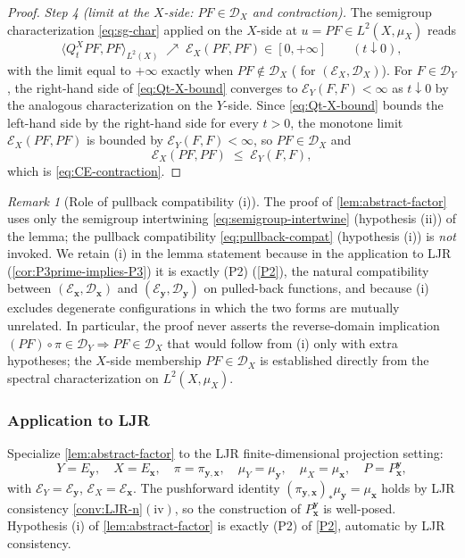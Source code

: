 \documentclass[11pt,reqno]{amsart}
\theoremstyle{plain}
\theoremstyle{definition}
\theoremstyle{remark}
\newtheorem{remark}[theorem]{Remark}
\newcommand{\cD}{\mathcal D}
\newcommand{\cE}{\mathcal E}
\begin{document}
\begin{proof}
\emph{Step 4 (limit at the $X$-side: $PF\in\cD_{X}$ and
contraction).}
The semigroup characterization \cref{eq:sg-char} applied on the
$X$-side at $u=PF\in L^{2}(X,\mu_{X})$ reads
\[
  \langle Q_{t}^{X}PF,PF\rangle_{L^{2}(X)}
  \;\nearrow\;\cE_{X}(PF,PF)\in[0,+\infty]\qquad(t\downarrow 0),
\]
with the limit equal to $+\infty$ exactly when $PF\notin\cD_{X}$
(\cite[Lem.~1.3.4]{FOT} for $(\cE_{X},\cD_{X})$). For
$F\in\cD_{Y}$, the right-hand side of \cref{eq:Qt-X-bound}
converges to $\cE_{Y}(F,F)<\infty$ as $t\downarrow 0$ by the
analogous characterization on the $Y$-side. Since
\cref{eq:Qt-X-bound} bounds the left-hand side by the right-hand
side for every $t>0$, the monotone limit $\cE_{X}(PF,PF)$ is
bounded by $\cE_{Y}(F,F)<\infty$, so $PF\in\cD_{X}$ and
\[
  \cE_{X}(PF,PF)\;\le\;\cE_{Y}(F,F),
\]
which is \cref{eq:CE-contraction}.
\end{proof}

\begin{remark}[Role of pullback compatibility (i)]\label{rem:pullback-not-used-in-proof}
The proof of \cref{lem:abstract-factor} uses only the semigroup
intertwining \cref{eq:semigroup-intertwine} (hypothesis (ii)) of
the lemma; the pullback compatibility
\cref{eq:pullback-compat} (hypothesis (i)) is \emph{not} invoked.
We retain (i) in the lemma statement because in the application to
LJR (\cref{cor:P3prime-implies-P3}) it is exactly (P2)
(\cref{P2}), the natural compatibility between
$(\cE_{\mathbf x},\cD_{\mathbf x})$ and
$(\cE_{\mathbf y},\cD_{\mathbf y})$ on pulled-back functions, and
because (i) excludes degenerate configurations in which the two
forms are mutually unrelated. In particular, the proof never asserts
the reverse-domain implication $(PF)\circ\pi\in\cD_{Y}\Rightarrow PF\in\cD_{X}$
that would follow from (i) only with extra hypotheses; the
$X$-side membership $PF\in\cD_{X}$ is established directly from the
spectral characterization on $L^{2}(X,\mu_{X})$.
\end{remark}

\subsubsection*{Application to LJR}

Specialize \cref{lem:abstract-factor} to the LJR finite-dimensional
projection setting:
\[
  Y=E_{\mathbf y},\quad X=E_{\mathbf x},\quad
  \pi=\pi_{\mathbf y,\mathbf x},\quad
  \mu_{Y}=\mu_{\mathbf y},\quad \mu_{X}=\mu_{\mathbf x},\quad
  P=P_{\mathbf x}^{\mathbf y},
\]
with $\cE_{Y}=\cE_{\mathbf y}$, $\cE_{X}=\cE_{\mathbf x}$. The
pushforward identity
$(\pi_{\mathbf y,\mathbf x})_{*}\mu_{\mathbf y}=\mu_{\mathbf x}$
holds by LJR consistency \cref{conv:LJR-n}$(\mathrm{iv})$, so the
construction of $P_{\mathbf x}^{\mathbf y}$ is well-posed.
Hypothesis (i) of \cref{lem:abstract-factor} is exactly (P2)
of \cref{P2}, automatic by LJR consistency.
\end{document}
